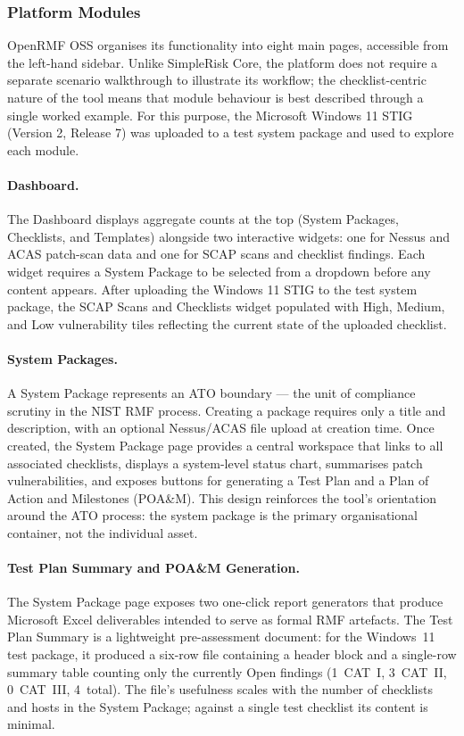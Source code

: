\subsubsection{Platform Modules}
\label{sec:openrmf-modules}

OpenRMF OSS organises its functionality into eight main pages, accessible
from the left-hand sidebar. Unlike SimpleRisk Core, the platform does not
require a separate scenario walkthrough to illustrate its workflow; the
checklist-centric nature of the tool means that module behaviour is best
described through a single worked example. For this purpose, the Microsoft
Windows 11 STIG (Version 2, Release 7) was uploaded to a test system package
and used to explore each module.

\paragraph{Dashboard.}
The Dashboard displays aggregate counts at the top (System Packages,
Checklists, and Templates) alongside two interactive widgets: one for Nessus
and ACAS patch-scan data and one for SCAP scans and checklist findings. Each
widget requires a System Package to be selected from a dropdown before any
content appears. After uploading the Windows 11 STIG to the test system
package, the SCAP Scans and Checklists widget populated with High, Medium,
and Low vulnerability tiles reflecting the current state of the uploaded
checklist.

\paragraph{System Packages.}
A System Package represents an ATO boundary — the unit of compliance
scrutiny in the NIST RMF process. Creating a package requires only a title
and description, with an optional Nessus/ACAS file upload at creation time.
Once created, the System Package page provides a central workspace that
links to all associated checklists, displays a system-level status chart,
summarises patch vulnerabilities, and exposes buttons for generating a Test
Plan and a Plan of Action and Milestones (POA\&M). This design reinforces
the tool's orientation around the ATO process: the system package is the
primary organisational container, not the individual asset.

\paragraph{Test Plan Summary and POA\&M Generation.}
The System Package page exposes two one-click report generators that produce
Microsoft Excel deliverables intended to serve as formal RMF artefacts.
The Test Plan Summary is a lightweight pre-assessment document: for the
Windows~11 test package, it produced a six-row file containing a header block
and a single-row summary table counting only the currently Open findings
(1~CAT~I, 3~CAT~II, 0~CAT~III, 4~total). The file's usefulness scales with the
number of checklists and hosts in the System Package; against a single test
checklist its content is minimal.

